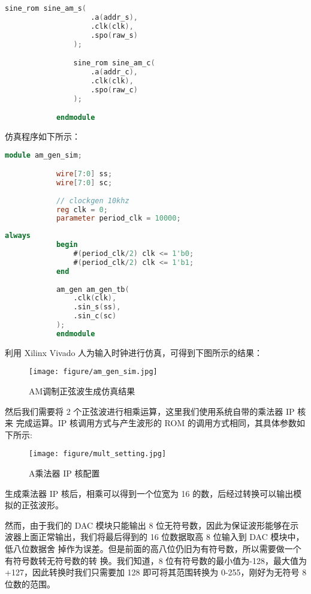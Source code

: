 {\begin{spacing}{1.5}
\begin{lstlisting}[language=Verilog]
				sine_rom sine_am_s(
					.a(addr_s),
					.clk(clk),
					.spo(raw_s)
				);

				sine_rom sine_am_c(
					.a(addr_c),
					.clk(clk),
					.spo(raw_c)
				);

			endmodule
			\end{lstlisting}

			仿真程序如下所示：

			\begin{lstlisting}[language=Verilog]
			module am_gen_sim;

			wire[7:0] ss;
			wire[7:0] sc;
			
			// clockgen 10khz
			reg clk = 0;
			parameter period_clk = 10000;
			\end{lstlisting}
			\begin{lstlisting}[language=Verilog]
			always
			begin
				#(period_clk/2) clk <= 1'b0;
				#(period_clk/2) clk <= 1'b1;
			end
			
			am_gen am_gen_tb(
				.clk(clk),
				.sin_s(ss),
				.sin_c(sc)
			);
			endmodule
			\end{lstlisting}

			利用 Xilinx Vivado 人为输入时钟进行仿真，可得到下图所示的结果：
			\newline
			\begin{figure}[htbp]
				\centering
				\texttt{[image: figure/am\_gen\_sim.jpg]}
				\caption{AM调制正弦波生成仿真结果}\label{fig:am_gen_sim}
			\end{figure}

			然后我们需要将 2 个正弦波进行相乘运算，这里我们使用系统自带的乘法器 IP 核来
			完成运算。IP 核调用方式与产生波形的 ROM 的调用方式相同，其具体参数如下所示:
			\newpage
			\begin{figure}[htbp]
				\centering
				\texttt{[image: figure/mult\_setting.jpg]}
				\caption{A乘法器 IP 核配置}\label{fig:mult_setting}
			\end{figure}

			生成乘法器 IP 核后，相乘可以得到一个位宽为 16 的数，后经过转换可以输出模拟的正弦波形。

			然而，由于我们的 DAC 模块只能输出 8 位无符号数，因此为保证波形能够在示波器上面正常输出，我们将最后得到的 16 位数据取高 8 位输入到 DAC 模块中，低八位数据舍 掉作为误差。但是前面的高八位仍旧为有符号数，所以需要做一个有符号数转无符号数的转 换。我们知道，8 位有符号数的最小值为-128，最大值为+127，因此转换时我们只需要加 128 即可将其范围转换为 0-255，刚好为无符号 8 位数的范围。


\end{spacing}}
